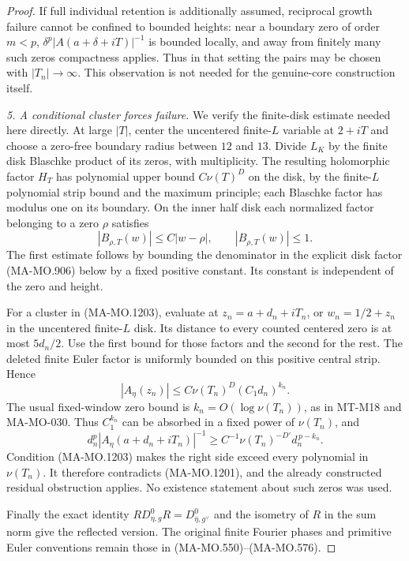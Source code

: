 \begin{proof}
If full individual retention is additionally assumed, reciprocal
growth failure cannot be confined to bounded heights: near a
boundary zero of order $m<p$, $\delta^p|A(a+\delta+iT)|^{-1}$
is bounded locally, and away from finitely many such zeros
compactness applies.  Thus in that setting the pairs may be
chosen with $|T_n|\to\infty$.  This observation is not needed
for the genuine-core construction itself.

\emph{5. A conditional cluster forces failure.}
We verify the finite-disk estimate needed here directly.
At large $|T|$, center the uncentered finite-$L$ variable at
$2+iT$ and choose a zero-free boundary radius between $12$
and $13$.  Divide $L_K$ by the finite disk Blaschke product
of its zeros, with multiplicity.  The resulting holomorphic
factor $H_T$ has polynomial upper bound $C\nu(T)^D$ on
the disk, by the finite-$L$ polynomial strip bound and the
maximum principle; each Blaschke factor has modulus one
on its boundary.  On the inner half disk each normalized
factor belonging to a zero $\rho$ satisfies
\[
      |B_{\rho,T}(w)|\le C|w-\rho|,
                       \qquad |B_{\rho,T}(w)|\le1.
 \tag{MA-MO.1219}
\]
The first estimate follows by bounding the denominator in
the explicit disk factor (MA-MO.906) below by a fixed positive
constant.  Its constant is independent of the zero and height.

For a cluster in (MA-MO.1203), evaluate at
$z_n=a+d_n+iT_n$, or $w_n=1/2+z_n$ in the uncentered
finite-$L$ disk.  Its distance to every counted centered zero is
at most $5d_n/2$.  Use the first bound for those factors and
the second for the rest.  The deleted finite Euler factor
is uniformly bounded on this positive central strip.  Hence
\[
 |A_\eta(z_n)|\le C\nu(T_n)^D(C_1d_n)^{k_n}.
 \tag{MA-MO.1220}
\]
The usual fixed-window zero bound is $k_n=O(\log\nu(T_n))$,
as in MT-M18 and MA-MO-030.  Thus $C_1^{k_n}$ can be absorbed
in a fixed power of $\nu(T_n)$, and
\[
 d_n^p|A_\eta(a+d_n+iT_n)|^{-1}
           \ge C^{-1}\nu(T_n)^{-D'}d_n^{\,p-k_n}.
 \tag{MA-MO.1221}
\]
Condition (MA-MO.1203) makes the right side exceed every
polynomial in $\nu(T_n)$.  It therefore contradicts
(MA-MO.1201), and the already constructed residual obstruction
applies.  No existence statement about such zeros was used.

Finally the exact identity
$R D_{\eta,g}^0R=D_{\bar\eta,g^\vee}^0$ and the isometry of
$R$ in the sum norm give the reflected version.  The original
finite Fourier phases and primitive Euler conventions remain
those in (MA-MO.550)--(MA-MO.576).
\end{proof}

